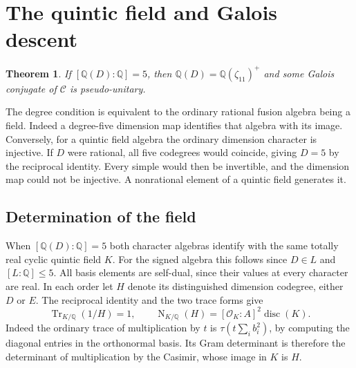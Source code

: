 \documentclass[11pt,a4paper]{article}
\newtheorem{theorem}{Theorem}[section]
\numberwithin{equation}{section}
\begin{document}
\section{The quintic field and Galois descent}\label{sec:quintic}
\begin{theorem}\label{thm:quintic}
If $[\mathbb Q(D):\mathbb Q]=5$, then
$\mathbb Q(D)=\mathbb Q(\zeta_{11})^+$ and some Galois conjugate of
$\mathcal C$ is pseudo-unitary.
\end{theorem}
The degree condition is equivalent to the ordinary rational fusion algebra
being a field. Indeed a degree-five dimension map identifies that algebra
with its image. Conversely, for a quintic field algebra the ordinary
dimension character is injective. If $D$ were rational, all five codegrees
would coincide, giving $D=5$ by the reciprocal identity. Every simple
would then be invertible, and the dimension map could not be injective.
A nonrational element of a quintic field generates it.

\subsection{Determination of the field}
When $[\mathbb Q(D):\mathbb Q]=5$ both character algebras identify with the
same totally real cyclic quintic field $K$. For the signed algebra this
follows since $D\in L$ and $[L:\mathbb Q]\le5$. All basis elements are
self-dual, since their values at every character are real. In each order
let $H$ denote its distinguished dimension codegree, either $D$ or $E$.
The reciprocal identity and the two trace forms give
\[
 \operatorname{Tr}_{K/\mathbb Q}(1/H)=1,\qquad
 \operatorname{N}_{K/\mathbb Q}(H)=
 [\mathcal O_K:A]^2\operatorname{disc}(K).
\]
Indeed the ordinary trace of multiplication by $t$ is
$\tau(t\sum_i b_i^2)$, by computing the diagonal entries in the
orthonormal basis. Its Gram determinant is therefore the determinant of
multiplication by the Casimir, whose image in $K$ is $H$.
\end{document}

